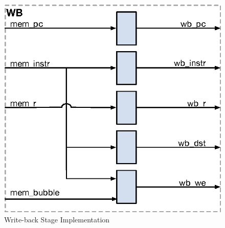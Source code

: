 \begin{figure}[h]
  \includegraphics{assets/img/Pipeline-WB}
  \caption{Write-back Stage Implementation}
\end{figure}

